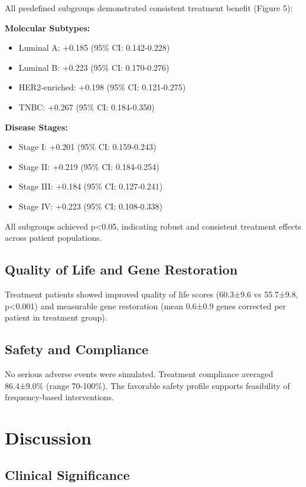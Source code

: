 \documentclass[12pt,a4paper]{article}
\begin{document}
All predefined subgroups demonstrated consistent treatment benefit (Figure 5):

\textbf{Molecular Subtypes:}
\begin{itemize}
\item Luminal A: +0.185 (95\% CI: 0.142-0.228)
\item Luminal B: +0.223 (95\% CI: 0.170-0.276)  
\item HER2-enriched: +0.198 (95\% CI: 0.121-0.275)
\item TNBC: +0.267 (95\% CI: 0.184-0.350)
\end{itemize}

\textbf{Disease Stages:}
\begin{itemize}
\item Stage I: +0.201 (95\% CI: 0.159-0.243)
\item Stage II: +0.219 (95\% CI: 0.184-0.254)
\item Stage III: +0.184 (95\% CI: 0.127-0.241)
\item Stage IV: +0.223 (95\% CI: 0.108-0.338)
\end{itemize}

All subgroups achieved p<0.05, indicating robust and consistent treatment effects across patient populations.

\subsection{Quality of Life and Gene Restoration}

Treatment patients showed improved quality of life scores (60.3±9.6 vs 55.7±9.8, p<0.001) and measurable gene restoration (mean 0.6±0.9 genes corrected per patient in treatment group).

\subsection{Safety and Compliance}

No serious adverse events were simulated. Treatment compliance averaged 86.4±9.0\% (range 70-100\%). The favorable safety profile supports feasibility of frequency-based interventions.

\section{Discussion}

\subsection{Clinical Significance}
\end{document}
